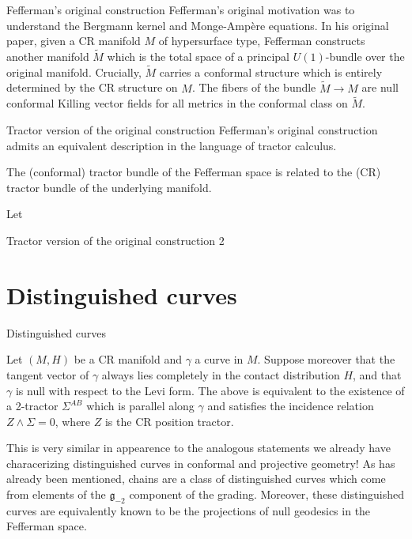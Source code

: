 \documentclass[handout]{beamer}
\begin{document}
\begin{frame}{Fefferman's original construction}
  Fefferman's original motivation was to understand the Bergmann kernel and
  Monge-Amp\`{e}re equations.
  \vfill
  In his original paper, given a CR manifold $M$ of hypersurface type, Fefferman
  constructs another manifold $\tilde{M}$ which is the total space of a principal
  $U(1)$-bundle over the original manifold.
  \vfill
  Crucially, $\tilde{M}$ carries a conformal structure which is entirely
  determined by the CR structure on $M$.
  The fibers of the bundle $\tilde{M} \to M$ are null conformal Killing vector fields for all
  metrics in the conformal class on $\tilde{M}$.
\end{frame}

\begin{frame}{Tractor version of the original construction}
  Fefferman's original construction admits an equivalent description in the
  language of tractor calculus.

  The (conformal) tractor bundle of the Fefferman space is related to
  the (CR) tractor bundle of the underlying manifold.

  

  \begin{theorem}[\v{C}ap-Gover, 2008]
    Let
  \end{theorem}
\end{frame}

\begin{frame}{Tractor version of the original construction 2}
\end{frame}
\section{Distinguished curves}

\begin{frame}{Distinguished curves}
  \begin{theorem}[Gover-S, 2018]
    Let $(M,H)$ be a CR manifold and $\gamma$ a curve in $M$. 
    Suppose moreover that the tangent vector of $\gamma$ always lies
    completely in the contact distribution $H$, and that $\gamma$ is null with
    respect to the Levi form. 
    The above is equivalent to the existence of a 2-tractor $\Sigma^{AB}$ which
    is parallel along $\gamma$ and satisfies the incidence relation $Z \wedge
    \Sigma = 0$, where $Z$ is the CR position tractor.
  \end{theorem}
  This is very similar in appearence to the analogous statements we already
  have characerizing distinguished curves in conformal and projective geometry!
  As has already been mentioned, chains are a class of distinguished curves
  which come from elements of the $\mathfrak{g}_{-2}$ component of the
  grading. 
  Moreover, these distinguished curves are equivalently known to be the
  projections of null geodesics in the Fefferman space. 
\end{frame}
\end{document}
